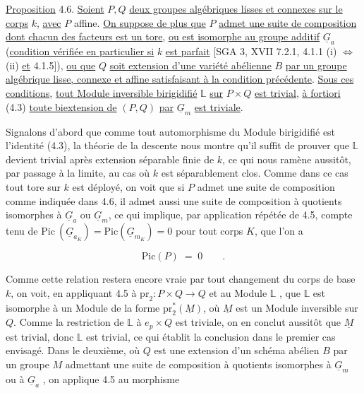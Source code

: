 \underline{Proposition} 4.6. \underline{Soient} $P,Q$ \underline{deux groupes algébriques lisses et connexes sur le corps} $k$, \underline{avec} $P$ affine. \underline{On suppose de plus que} $P$ \underline{admet une suite de composition dont chacun des facteurs est un tore}, \underline{ou est isomorphe au groupe additif} $\underline{G}_a$ (\underline{condition vérifiée en particulier si} $k$ \underline{est parfait} [SGA 3, XVII 7.2.1, 4.1.1 (i) $\Longleftrightarrow$ (ii) \underline{et} 4.1.5]), \underline{ou que} $Q$ \underline{soit extension d'une variété abélienne} $B$ \underline{par un groupe algébrique lisse, connexe et affine satisfaisant à la condition précédente}. \underline{Sous ces conditions}, \underline{tout Module inversible birigidifié} $\mathbb{L}$ \underline{sur} $P \times Q$ \underline{est trivial}, \underline{à fortiori} (4.3) \underline{toute biextension de} $(P,Q)$ \underline{par} $\underline{G}_m$ \underline{est triviale}.

Signalons d'abord que comme tout automorphisme du Module birigidifié est l'identité (4.3), la théorie de la descente nous montre qu'il suffit de prouver que $\mathbb{L}$ devient trivial après extension séparable finie de $k$, ce qui nous ramène aussitôt, par passage à la limite, au cas où $k$ est séparablement clos. Comme dans ce cas tout tore sur $k$ est déployé, on voit que si $P$ admet une suite de composition comme indiquée dans 4.6, il admet aussi une suite de composition à quotients isomorphes à $\underline{G}_a$ ou $\underline{G}_m$, ce qui implique, par application répétée de 4.5, compte tenu de $\mathrm{Pic}\ (\underline{G}_{a_K}) = \mathrm{Pic}(\underline{G}_{m_K}) = 0$ pour tout corps $K$, que l'on a

\begin{equation*}
\mathrm{Pic}(P) \;=\; 0 \qquad .
\end{equation*}


Comme cette relation restera encore vraie par tout changement du corps de base $k$, on voit, en appliquant 4.5 à $\mathrm{pr}_2 : P \times Q \longrightarrow Q$ et au Module $\mathbb{L}$ , que $\mathbb{L}$ est isomorphe à un Module de la forme $\mathrm{pr}_2^*(\underline{M})$, où $\underline{M}$ est un Module inversible sur $Q$. Comme la restriction de $\mathbb{L}$ à $e_p \times Q$ est triviale, on en conclut aussitôt que $\underline{M}$ est trivial, donc $\mathbb{L}$ est trivial, ce qui établit la conclusion dans le premier cas envisagé. Dans le deuxième, où $Q$ est une extension d'un schéma abélien $B$ par un groupe $M$ admettant une suite de composition à quotients isomorphes à $\underline{G}_m$ ou à $\underline{G}_a$ , on applique 4.5 au morphisme

